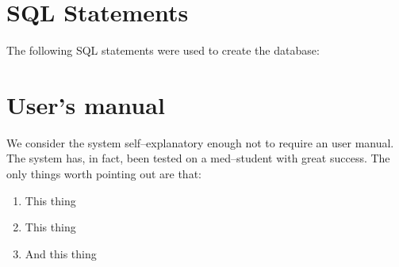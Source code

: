 \documentclass[a4paper]{scrartcl}
\numberwithin{equation}{section}
\begin{document}

\section*{SQL Statements}
The following SQL statements were used to create the database:


\section*{User's manual}
We consider the system self--explanatory enough not to require an user manual. 
The system has, in fact, been tested on a med--student with great success.
The only things worth pointing out are that:

\begin{enumerate}
  \item This thing
  \item This thing
  \item And this thing
\end{enumerate}

% 






    

\end{document}
